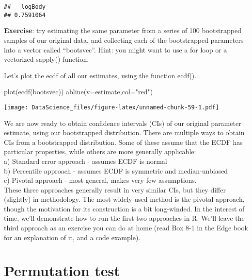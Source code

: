 \documentclass[
]{book}
\newenvironment{Shaded}{\begin{snugshade}}{\end{snugshade}}
\newcommand{\AttributeTok}[1]{\textcolor[rgb]{0.77,0.63,0.00}{#1}}
\newcommand{\FunctionTok}[1]{\textcolor[rgb]{0.00,0.00,0.00}{#1}}
\newcommand{\NormalTok}[1]{#1}
\newcommand{\StringTok}[1]{\textcolor[rgb]{0.31,0.60,0.02}{#1}}
\begin{document}
\begin{verbatim}
##   logBody 
## 0.7591064
\end{verbatim}

\textbf{Exercise}: try estimating the same parameter from a series of 100 bootstrapped samples of our original data, and collecting each of the bootstrapped parameters into a vector called ``bootsvec''. Hint: you might want to use a for loop or a vectorized sapply() function.

Let's plot the ecdf of all our estimates, using the function ecdf().

\begin{Shaded}
\begin{Highlighting}[]
\FunctionTok{plot}\NormalTok{(}\FunctionTok{ecdf}\NormalTok{(bootsvec))}
\FunctionTok{abline}\NormalTok{(}\AttributeTok{v=}\NormalTok{estimate,}\AttributeTok{col=}\StringTok{"red"}\NormalTok{)}
\end{Highlighting}
\end{Shaded}

\texttt{[image: DataScience\_files/figure-latex/unnamed-chunk-59-1.pdf]}

We are now ready to obtain confidence intervals (CIs) of our original parameter estimate, using our bootstrapped distribution. There are multiple ways to obtain CIs from a bootstrapped distribution. Some of these assume that the ECDF has particular properties, while others are more generally applicable:\\
a) Standard error approach - assumes ECDF is normal\\
b) Percentile approach - assumes ECDF is symmetric and median-unbiased\\
c) Pivotal approach - most general, makes very few assumptions.\\
These three approaches generally result in very similar CIs, but they differ (slightly) in methodology. The most widely used method is the pivotal approach, though the motivation for its construction is a bit long-winded. In the interest of time, we'll demonstrate how to run the first two approaches in R. We'll leave the third approach as an exercise you can do at home (read Box 8-1 in the Edge book for an explanation of it, and a code example).

\hypertarget{permutation-test}{%
\section{Permutation test}\label{permutation-test}}
\end{document}

